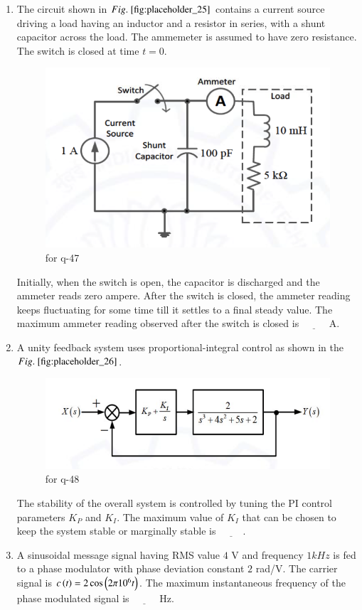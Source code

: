 \documentclass[journal,12pt,onecolumn]{IEEEtran}
\theoremstyle{remark}
\begin{document}
\begin{enumerate}
\item The circuit shown in $\figref{fig:placeholder_25}$ contains a current source driving a load having an inductor and a resistor in series, with a shunt capacitor across the load. The ammemeter is assumed to have zero resistance. The switch is closed at time $t = 0$.  
\begin{figure}[H]
    \centering
    \includegraphics[width=0.4\columnwidth]{figs/25.png}
    \caption{\centering for q-47}
    \label{fig:placeholder_25}
\end{figure}
Initially, when the switch is open, the capacitor is discharged and the ammeter reads zero ampere. After the switch is closed, the ammeter reading keeps fluctuating for some time till it settles to a final steady value. The maximum ammeter reading observed after the switch is closed  is $\underline{\hspace{1cm}}$ A.  

\hfill {}

\item A unity feedback system uses proportional-integral  control as shown in the $\figref{fig:placeholder_26}$.
\begin{figure}[H]
    \centering
    \includegraphics[width=0.5\columnwidth]{figs/26.png}
    \caption{\centering for q-48}
    \label{fig:placeholder_26}
\end{figure}
The stability of the overall system is controlled by tuning the PI control parameters $K_P$ and $K_I$. The maximum value of $K_I$ that can be chosen to keep the system stable or marginally stable   is $\underline{\hspace{1cm}}$.

\hfill {}

\item A sinusoidal message signal having RMS value $4$ V and frequency $1 kHz$ is fed to a phase modulator with phase deviation constant $2$ rad/V. The carrier signal is $c\left(t\right) = 2 \cos\left(2\pi 10^6 t\right)$.  
The maximum instantaneous frequency of the phase modulated signal  is $\underline{\hspace{1cm}}$ Hz.  


\end{enumerate}
\end{document}
